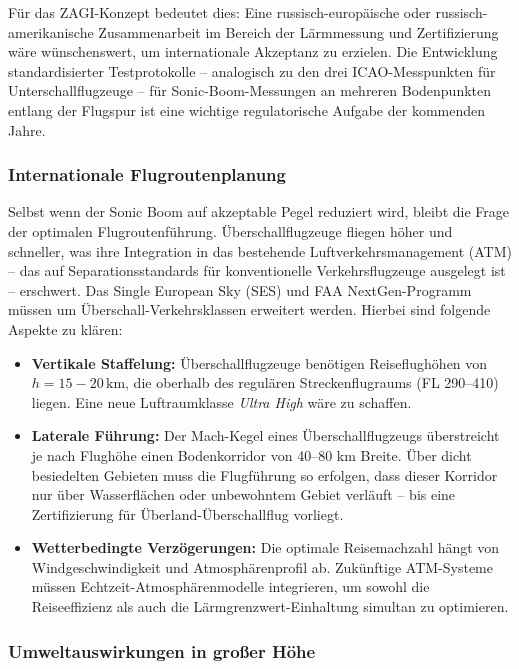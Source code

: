 ﻿\documentclass[12pt,a4paper]{article}
\theoremstyle{definition}
\theoremstyle{remark}
\begin{document}
Für das ZAGI-Konzept bedeutet dies: Eine russisch-europäische oder russisch-amerika\-nische
Zusammenarbeit im Bereich der Lärmmessung und Zertifizierung wäre wünschenswert,
um internationale Akzeptanz zu erzielen. Die Entwicklung standardisierter Testprotokolle
-- analogisch zu den drei ICAO-Messpunkten für Unterschallflugzeuge -- für Sonic-Boom-Messungen
an mehreren Bodenpunkten entlang der Flugspur ist eine wichtige regulatorische Aufgabe
der kommenden Jahre.

\subsubsection{Internationale Flugroutenplanung}

Selbst wenn der Sonic Boom auf akzeptable Pegel reduziert wird, bleibt die
Frage der optimalen Flugroutenführung. Überschallflugzeuge fliegen höher und schneller,
was ihre Integration in das bestehende Luftverkehrsmanagement (ATM) -- das auf
Separationsstandards für konventionelle Verkehrsflugzeuge ausgelegt ist -- erschwert.
Das Single European Sky (SES) und FAA NextGen-Programm müssen um
Überschall-Verkehrsklassen erweitert werden. Hierbei sind folgende Aspekte zu klären:

\begin{itemize}
  \item \textbf{Vertikale Staffelung:} Überschallflugzeuge benötigen Reiseflughöhen von
        $h = 15{-}20\,\text{km}$, die oberhalb des regulären Streckenflugraums
        (FL 290--410) liegen. Eine neue Luftraumklasse \emph{Ultra High} wäre zu schaffen.
  \item \textbf{Laterale Führung:} Der Mach-Kegel eines Überschallflugzeugs überstreicht
        je nach Flughöhe einen Bodenkorridor von 40--80 km Breite. Über dicht besiedelten
        Gebieten muss die Flugführung so erfolgen, dass dieser Korridor nur über Wasserflächen
        oder unbewohntem Gebiet verläuft -- bis eine Zertifizierung für Überland-Überschallflug
        vorliegt.
  \item \textbf{Wetterbedingte Verzögerungen:} Die optimale Reisemachzahl hängt von
        Windgeschwindigkeit und Atmosphärenprofil ab. Zukünftige ATM-Systeme müssen
        Echtzeit-Atmosphärenmodelle integrieren, um sowohl die Reiseeffizienz als auch
        die Lärmgrenz\-wert-Einhaltung simultan zu optimieren.
\end{itemize}

\subsubsection{Umweltauswirkungen in großer Höhe}
\end{document}
